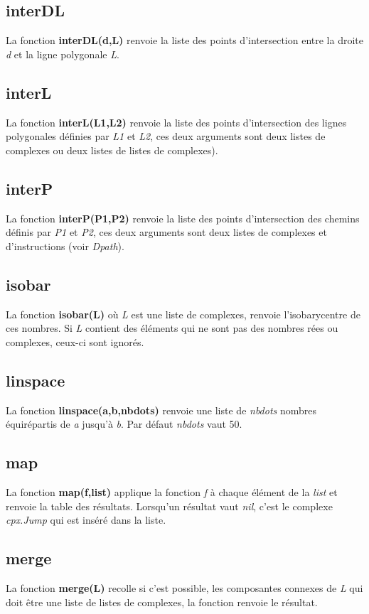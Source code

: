\subsection{interDL}
La fonction \textbf{interDL(d,L)} renvoie la liste des points d'intersection entre la droite \emph{d} et la ligne polygonale \emph{L}.

\subsection{interL}
La fonction \textbf{interL(L1,L2)} renvoie la liste des points d'intersection des lignes polygonales définies par \emph{L1} et \emph{L2}, ces deux arguments sont deux listes de complexes ou deux listes de listes de complexes).

\subsection{interP}
La fonction \textbf{interP(P1,P2)} renvoie la liste des points d'intersection des chemins définis par \emph{P1} et \emph{P2}, ces deux arguments sont deux listes de complexes et d'instructions (voir \emph{Dpath}).

\subsection{isobar}
La fonction \textbf{isobar(L)} où \emph{L} est une liste de complexes, renvoie l'isobarycentre de ces nombres. Si \emph{L} contient des éléments qui ne sont pas des nombres rées ou complexes, ceux-ci sont ignorés.

\subsection{linspace}
La fonction \textbf{linspace(a,b,nbdots)} renvoie une liste de \emph{nbdots} nombres équirépartis de \emph{a} jusqu'à \emph{b}. Par défaut \emph{nbdots} vaut 50.

\subsection{map}
La fonction \textbf{map(f,list)} applique la fonction \emph{f} à chaque élément de la \emph{list} et renvoie la table des résultats. Lorsqu'un résultat vaut \emph{nil}, c'est le complexe \emph{cpx.Jump} qui est inséré dans la liste.

\subsection{merge}
La fonction \textbf{merge(L)} recolle si c'est possible, les composantes connexes de \emph{L} qui doit être une liste de listes de complexes, la fonction renvoie le résultat.

